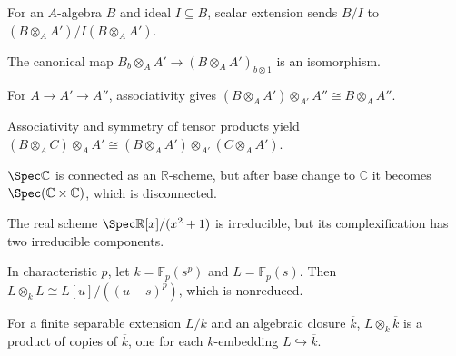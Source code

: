 \begin{example}\label{ex:vi24-a01}
For an $A$-algebra $B$ and ideal $I\subseteq B$, scalar extension sends $B/I$ to $(B\otimes_AA')/I(B\otimes_AA')$.
\end{example}

\begin{example}\label{ex:vi24-a02}
The canonical map $B_b\otimes_AA'\to(B\otimes_AA')_{b\otimes1}$ is an isomorphism.
\end{example}

\begin{example}\label{ex:vi24-a03}
For $A\to A'\to A''$, associativity gives $(B\otimes_AA')\otimes_{A'}A''\cong B\otimes_AA''$.
\end{example}

\begin{example}\label{ex:vi24-a04}
Associativity and symmetry of tensor products yield $(B\otimes_AC)\otimes_AA'\cong(B\otimes_AA')\otimes_{A'}(C\otimes_AA')$.
\end{example}

\begin{example}\label{ex:vi24-a05}
$\Spec\mathbb C$ is connected as an $\mathbb R$-scheme, but after base change to $\mathbb C$ it becomes $\Spec(\mathbb C\times\mathbb C)$, which is disconnected.
\end{example}

\begin{example}\label{ex:vi24-a06}
The real scheme $\Spec\mathbb R[x]/(x^2+1)$ is irreducible, but its complexification has two irreducible components.
\end{example}

\begin{example}\label{ex:vi24-a07}
In characteristic $p$, let $k=\mathbb F_p(s^p)$ and $L=\mathbb F_p(s)$. Then $L\otimes_kL\cong L[u]/((u-s)^p)$, which is nonreduced.
\end{example}

\begin{example}\label{ex:vi24-a08}
For a finite separable extension $L/k$ and an algebraic closure $\overline k$, $L\otimes_k\overline k$ is a product of copies of $\overline k$, one for each $k$-embedding $L\hookrightarrow\overline k$.
\end{example}

